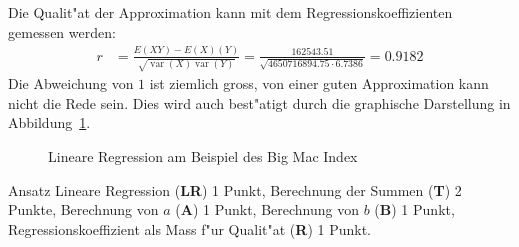 \begin{loesung}
\begin{teilaufgaben}
\item
Die Qualit"at der Approximation kann mit dem Regressionskoeffizienten
gemessen werden:
\begin{align*}
r
&=
\frac{E(XY)-E(X)(Y)}{\sqrt{\operatorname{var}(X)\operatorname{var}(Y)}}
=\frac{162543.51}{\sqrt{
4650716894.75
\cdot
6.7386
}}
=0.9182
\end{align*}
Die Abweichung von $1$ ist ziemlich gross, von einer guten Approximation
kann nicht die Rede sein.
Dies wird auch best"atigt durch die graphische Darstellung in
Abbildung~\ref{40000037:lin}.
\begin{figure}
\centering
{}
\caption{Lineare Regression am Beispiel des Big Mac Index
\label{40000037:lin}}
\end{figure}
\end{teilaufgaben}
\end{loesung}

\begin{bewertung}
Ansatz Lineare Regression ({\bf LR}) 1 Punkt,
Berechnung der Summen ({\bf T}) 2 Punkte,
Berechnung von $a$ ({\bf A}) 1 Punkt,
Berechnung von $b$ ({\bf B}) 1 Punkt,
Regressionskoeffizient als Mass f"ur Qualit"at ({\bf R}) 1 Punkt.
\end{bewertung}



